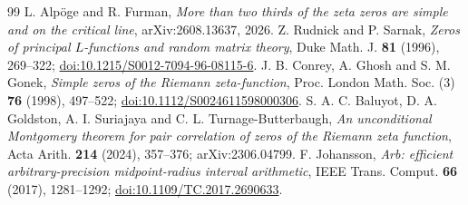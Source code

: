 \documentclass[11pt]{article}
\theoremstyle{definition}\newtheorem{definition}[theorem]{Definition}
\theoremstyle{remark}\newtheorem{remark}[theorem]{Remark}
\begin{document}
\begin{thebibliography}{99}
 L. Alp\"oge and R. Furman, \emph{More than two thirds of the
zeta zeros are simple and on the critical line}, arXiv:2608.13637, 2026.
 Z. Rudnick and P. Sarnak, \emph{Zeros of principal
$L$-functions and random matrix theory}, Duke Math. J. \textbf{81} (1996),
269--322; \href{https://doi.org/10.1215/S0012-7094-96-08115-6}{doi:10.1215/S0012-7094-96-08115-6}.
 J. B. Conrey, A. Ghosh and S. M. Gonek, \emph{Simple zeros
of the Riemann zeta-function}, Proc. London Math. Soc. (3) \textbf{76}
(1998), 497--522; \href{https://doi.org/10.1112/S0024611598000306}{doi:10.1112/S0024611598000306}.
 S. A. C. Baluyot, D. A. Goldston, A. I. Suriajaya and
C. L. Turnage-Butterbaugh, \emph{An unconditional Montgomery theorem for
pair correlation of zeros of the Riemann zeta function}, Acta Arith.
\textbf{214} (2024), 357--376; arXiv:2306.04799.
 F. Johansson, \emph{Arb: efficient arbitrary-precision
midpoint-radius interval arithmetic}, IEEE Trans. Comput. \textbf{66}
(2017), 1281--1292; \href{https://doi.org/10.1109/TC.2017.2690633}{doi:10.1109/TC.2017.2690633}.
\end{thebibliography}
\end{document}
